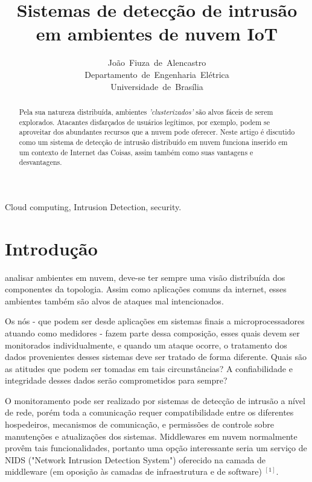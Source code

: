 \documentclass[journal]{IEEEtran}
\begin{document}
\title{Sistemas de detecção de intrusão\\ em ambientes de nuvem IoT}


\author{João~Fiuza~de~Alencastro\\Departamento~de~Engenharia~Elétrica\\Universidade~de~Brasília}%




\maketitle


\begin{abstract}
Pela sua natureza distribuída, ambientes \textit{'clusterizados'} são alvos fáceis de serem explorados. Atacantes disfarçados de usuários legítimos, por exemplo, podem se aproveitar dos abundantes recursos que a nuvem pode oferecer. Neste artigo é discutido como um sistema de detecção de intrusão distribuído em nuvem funciona inserido em um contexto de Internet das Coisas, assim também como suas vantagens e desvantagens.%
\end{abstract}

\begin{IEEEkeywords}
Cloud computing, Intrusion Detection, security.
\end{IEEEkeywords}


\IEEEpeerreviewmaketitle



\section{Introdução}
 analisar ambientes em nuvem, deve-se ter sempre uma visão distribuída dos componentes da topologia. Assim como aplicações comuns da internet, esses ambientes também são alvos de ataques mal intencionados. \par
Os nós - que podem ser desde aplicações em sistemas finais a microprocessadores atuando como medidores - fazem parte dessa composição, esses quais devem ser monitorados individualmente, e quando um ataque ocorre, o tratamento dos dados provenientes desses sistemas deve ser tratado de forma diferente. Quais são as atitudes que podem ser tomadas em tais circunstâncias? A confiabilidade e integridade desses dados serão comprometidos para sempre? \par
O monitoramento pode ser realizado por sistemas de detecção de intrusão a nível de rede, porém toda a comunicação requer compatibilidade entre os diferentes hospedeiros, mecanismos de comunicação, e permissões de controle sobre manutenções e atualizações dos sistemas. Middlewares em nuvem normalmente provêm tais funcionalidades, portanto uma opção interessante seria um serviço de NIDS ("Network Intrusion Detection System") oferecido na camada de middleware (em oposição às camadas de infraestrutura e de software) $^{ [1] }$.
\end{document}
